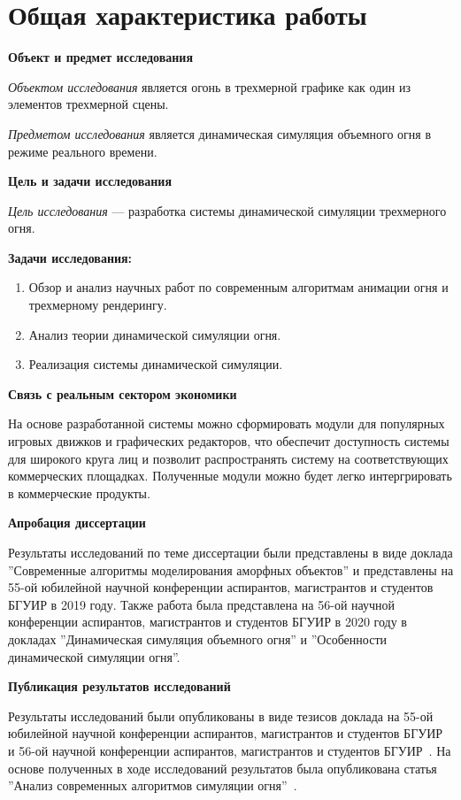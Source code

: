 \part*{Общая характеристика работы}

\textbf{Объект и предмет исследования}

\emph{Объектом исследования} является огонь в трехмерной графике как один из
элементов трехмерной сцены.

\emph{Предметом исследования} является динамическая симуляция объемного огня в
режиме реального времени.

\textbf{Цель и задачи исследования}

\emph{Цель исследования} --- разработка системы динамической симуляции
\break{}трехмерного огня.

\textbf{Задачи исследования:}

\begin{enumerate}
	\item Обзор и анализ научных работ по современным алгоритмам анимации огня и
        трехмерному рендерингу.
	\item Анализ теории динамической симуляции огня.
	\item Реализация системы динамической симуляции.
\end{enumerate}

\textbf{Связь с реальным сектором экономики}

На основе разработанной системы можно сформировать модули для популярных игровых
движков и графических редакторов, что обеспечит доступность системы для широкого
круга лиц и позволит распространять систему на соответствующих коммерческих
площадках. Полученные модули можно будет легко интергрировать в коммерческие
продукты.

\textbf{Апробация диссертации}

Результаты исследований по теме диссертации были представлены в виде доклада
''Современные алгоритмы моделирования аморфных объектов'' и представлены на
55-ой юбилейной научной конференции аспирантов, магистрантов и студентов БГУИР
в 2019 году. Также работа была представлена на 56-ой научной конференции
аспирантов, магистрантов и студентов БГУИР в 2020 году в докладах ''Динамическая
симуляция объемного огня'' и ''Особенности динамической симуляции огня''.

\textbf{Публикация результатов исследований}

Результаты исследований были опубликованы в виде тезисов доклада на 55-ой
юбилейной научной конференции аспирантов, магистрантов и студентов
БГУИР~\cite{55_sntk} и 56-ой научной конференции аспирантов, магистрантов и
студентов БГУИР~\cite{56_sntk,56_sntk_vmip}.
На основе полученных в ходе исследований
результатов была опубликована статья ''Анализ современных алгоритмов симуляции
огня''~\cite{mol_uch}.
